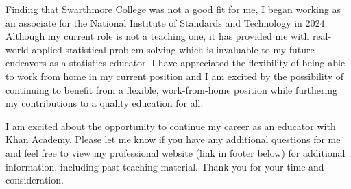 \documentclass[11pt,a4paper,sans]{moderncv}
\begin{document}
	Finding that Swarthmore College was not a good fit for me, I began working as an associate for the National Institute of Standards and Technology in 2024. Although my current role is not a teaching one, it has provided me with real-world applied statistical problem solving which is invaluable to my future endeavors as a statistics educator. I have appreciated the flexibility of being able to work from home in my current position and I am excited by the possibility of continuing to benefit from a flexible, work-from-home position while furthering my contributions to a quality education for all. 
	
	I am excited about the opportunity to continue my career as an educator with Khan Academy. Please let me know if you have any additional questions for me and feel free to view my professional website (link in footer below) for additional information, including past teaching material. Thank you for your time and consideration.\\
	
	
	\vspace{3mm}
	
	\makeletterclosing
	
\end{document}
